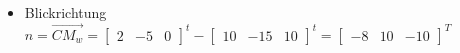 \subsubsection{}
\begin{itemize}
	\item Blickrichtung $n=\overrightarrow{CM_w} = 
	\begin{bmatrix}
		2  & -5 & 0 
	\end{bmatrix}^t - \begin{bmatrix}
	10  & -15 & 10 
	\end{bmatrix}^t = \begin{bmatrix}
	-8  & 10 & -10 
	\end{bmatrix}^T$
\end{itemize}

